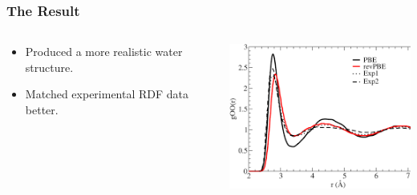 \begin{frame}
    \frametitle{The Result}
    \begin{columns}[T]
        \begin{column}{0.5\textwidth}
            \vspace{2cm}
            \begin{itemize}
                \item Produced a more realistic water structure.
                \item Matched experimental RDF data better.
            \end{itemize}
        \end{column}
        \begin{column}{0.5\textwidth}
            \includegraphics[width=\textwidth]{images/waterMP22.png}
        \end{column}
    \end{columns}
\end{frame}

